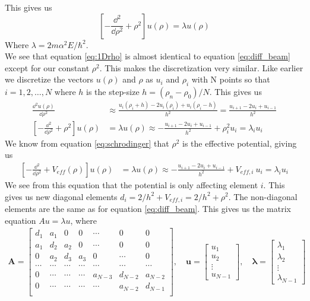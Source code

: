 \documentclass[american,a4paper,12pt]{article}
\renewcommand{\vec}[1]{\mathbf{#1}} %
\begin{document}
This gives us
\begin{equation}
    \left[ -\frac{\dd^2}{\dd \rho^2} + \rho^2 \right] u(\rho) = \lambda u(\rho)
    \label{eq:1Drho}
\end{equation}
Where $\lambda=2m\alpha^2 E/\hbar^2$.\\
We see that equation \ref{eq:1Drho} is almost identical to equation \ref{eq:diff_beam} except for our constant $\rho^2$. This makes the discretization very similar. Like earlier we discretize the vectors $u(\rho)$ and $\rho$ as $u_i$ and $\rho_i$ with N points so that $i = 1, 2, \dots, N$ where $h$ is the step-size $h=(\rho_n-\rho_0)/N$. This gives us
\begin{align*}
    \frac{\dd^2 u(\rho)}{\dd \rho^2} &\approx \frac{u_i(\rho_i + h) - 2u_i(\rho_i) + u_i(\rho_i - h)}{h^2} = \frac{u_{i+1}- 2u_i + u_{i-1}}{h^2}\\
    \left[ -\frac{\dd^2}{\dd \rho^2} + \rho^2 \right] u(\rho) &= \lambda u(\rho) \approx
    -\frac{u_{i+1}- 2u_i + u_{i-1}}{h^2} +\rho^2_i u_i = \lambda_i u_i
\end{align*}
We know from equation \ref{eq:schrodinger} that $\rho^2$ is the effective potential, giving us
\begin{align*}
        \left[ -\frac{\dd^2}{\dd \rho^2} + V_{eff}(\rho) \right] u(\rho) &= \lambda u(\rho) \approx
    -\frac{u_{i+1}- 2u_i + u_{i-1}}{h^2} +V_{eff,i}\ u_i = \lambda_i u_i
\end{align*}
We see from this equation that the potential is only affecting element $i$. This gives us new diagonal elements $d_i = 2/h^2 +V_{eff,i} = 2/h^2 + \rho^2$. The non-diagonal elements are the same as for equation \ref{eq:diff_beam}. This gives us the matrix equation $A u = \lambda u$, where
\begin{align*}
    \vec{A} = \begin{bmatrix}
        d_1 & a_1 & 0 & 0 & \cdots & 0 & 0 \\
        a_1 & d_2 & a_2 & 0 & \cdots & 0 & 0 \\
        0 & a_2 & d_3 & a_3 & 0 & \cdots & 0 \\
        \cdots & \cdots & \cdots & \cdots & \cdots & \cdots & \cdots \\
        0 & \cdots & \cdots & \cdots & a_{N-3} & d_{N-2} & a_{N-2} \\
        0 & \cdots & \cdots & \cdots & \cdots & a_{N-2} & d_{N-1} \\
    \end{bmatrix},
    \quad \vec{u} = \begin{bmatrix} u_1\\ u_2 \\ \vdots \\ u_{N-1} \end{bmatrix},
    \quad \boldsymbol{\lambda} = \begin{bmatrix} \lambda_1\\ \lambda_2 \\ \vdots \\ \lambda_{N-1} \end{bmatrix}
\end{align*}
\end{document}
